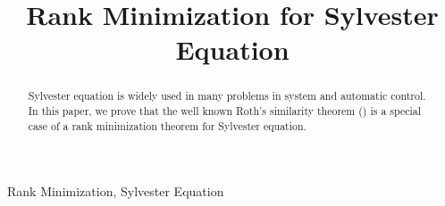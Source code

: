 \documentclass[preprint,12pt,authoryear]{elsarticle}
\theoremstyle{cupthm}
\theoremstyle{cupdefn}
\theoremstyle{cuprem}
\numberwithin{equation}{section}
\begin{document}
\begin{frontmatter}



\title{Rank Minimization for Sylvester Equation}


\author{}

\address{}

\begin{abstract}
Sylvester equation is widely used in many problems in system and automatic control. In this paper, we prove that the well known Roth's similarity theorem (\cite{5}) is a special case of a rank minimization theorem for Sylvester equation.
\end{abstract}

\begin{keyword}
Rank Minimization, Sylvester Equation



\end{keyword}

\end{frontmatter}



\end{document}
